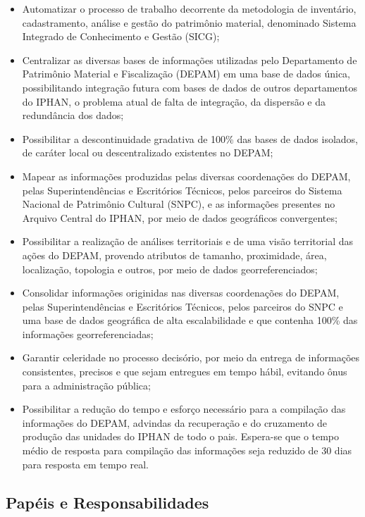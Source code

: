\begin{itemize}
\item Automatizar o processo de trabalho decorrente da metodologia de inventário, cadastramento, análise e gestão do patrimônio material, denominado Sistema Integrado de Conhecimento e Gestão (SICG);
\item Centralizar as diversas bases de informações utilizadas pelo Departamento de Patrimônio Material e Fiscalização (DEPAM) em uma base de dados única, possibilitando integração futura com bases de dados de outros departamentos do IPHAN,   o problema atual de falta de integração, da dispersão e da redundância dos dados;
\item Possibilitar a descontinuidade gradativa de 100\% das bases de dados isolados, de caráter local ou descentralizado existentes no DEPAM;
\item Mapear as informações produzidas pelas diversas coordenações do DEPAM, pelas Superintendências e Escritórios Técnicos, pelos parceiros do Sistema Nacional de Patrimônio Cultural (SNPC), e as informações presentes no Arquivo Central do IPHAN, por meio de dados geográficos convergentes;
\item Possibilitar a realização de análises territoriais e de uma visão territorial das ações do DEPAM, provendo atributos de tamanho, proximidade, área, localização, topologia e outros, por meio de dados georreferenciados;
\item Consolidar informações originidas nas diversas coordenações do DEPAM, pelas Superintendências e Escritórios Técnicos, pelos parceiros do SNPC e uma base de dados geográfica de alta escalabilidade e que contenha 100\% das informações georreferenciadas;
\item Garantir celeridade no processo decisório, por meio da entrega de informações consistentes, precisos e que sejam entregues em tempo hábil, evitando ônus para a administração pública;
\item Possibilitar a redução do tempo e esforço necessário para a compilação das informações do DEPAM, advindas da recuperação e do cruzamento de produção das unidades do IPHAN de todo o pais. Espera-se que o tempo médio de resposta para compilação das informações seja reduzido de 30 dias para resposta em tempo real.
\end{itemize}

\subsection[Papéis e Responsabilidades]{Papéis e Responsabilidades}

